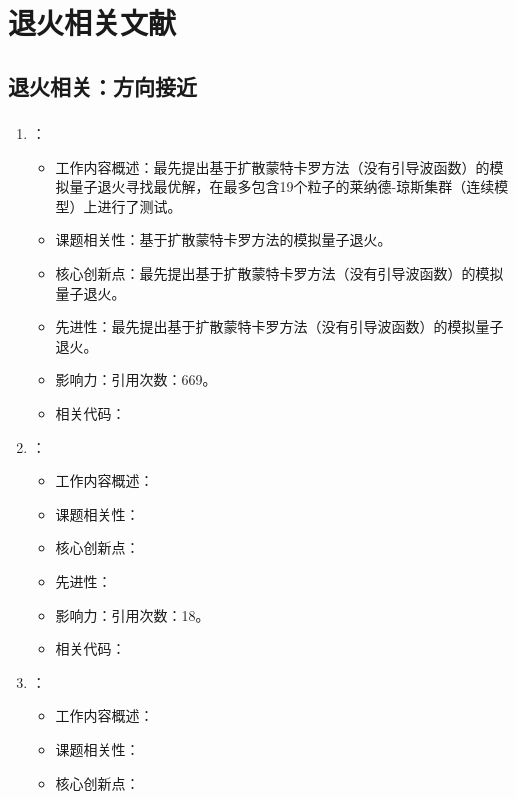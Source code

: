 \chapter{退火相关文献}
\section{退火相关：方向接近}
\subsection{}
    \begin{enumerate}
        \item \citet{finnila1994quantum}：
            \begin{itemize}
                \item 工作内容概述：最先提出基于扩散蒙特卡罗方法（没有引导波函数）的模拟量子退火寻找最优解，在最多包含19个粒子的莱纳德-琼斯集群（连续模型）上进行了测试。
                \item 课题相关性：基于扩散蒙特卡罗方法的模拟量子退火。
                \item 核心创新点：最先提出基于扩散蒙特卡罗方法（没有引导波函数）的模拟量子退火。
                \item 先进性：最先提出基于扩散蒙特卡罗方法（没有引导波函数）的模拟量子退火。
                \item 影响力：引用次数：669。
                \item 相关代码：
            \end{itemize}
            \item \citet{inack2015simulated}：
            \begin{itemize}
                \item 工作内容概述：
                \item 课题相关性：
                \item 核心创新点：
                \item 先进性：
                \item 影响力：引用次数：18。
                \item 相关代码：
            \end{itemize}
        \item \citet{santoro2006optimization}：
        \begin{itemize}
            \item 工作内容概述：
            \item 课题相关性：
            \item 核心创新点：

\end{itemize}
\end{enumerate}
